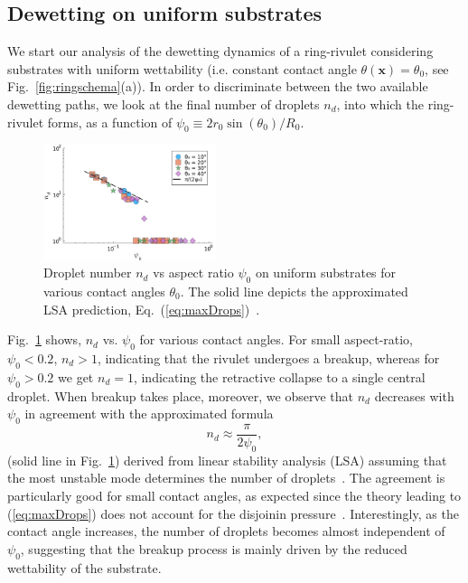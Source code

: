 \documentclass[twoside,twocolumn,9pt]{article}
\begin{document}
\subsection{Dewetting on uniform substrates}\label{subsec:drop-counting}
We start our analysis of the dewetting dynamics of a ring-rivulet considering substrates with uniform wettability (i.e. constant contact angle $\theta(\mathbf{x}) = \theta_0$, see Fig.~\ref{fig:ringschema}(a)). 
In order to discriminate between the two available dewetting paths, we look at the final number of droplets $n_d$, into which the ring-rivulet forms, as a function of $\psi_0 \equiv 2r_0\sin(\theta_0)/R_0$.
\begin{figure}
    \centering
    \includegraphics[width=0.45\textwidth]{Figure_2.pdf}   
    \caption{Droplet number $n_d$ vs aspect ratio $\psi_0$ on uniform substrates for various contact angles $\theta_0$. 
    The solid line depicts the approximated LSA prediction, Eq.~(\ref{eq:maxDrops})~\cite{gonzalezStabilityLiquidRing2013}.}
    \label{fig:max_drops}
\end{figure}
Fig.~\ref{fig:max_drops} shows, $n_d$ vs. $\psi_0$ for various contact angles. 
For small aspect-ratio, $\psi_0 <0.2$, $n_d>1$, indicating that the rivulet undergoes a breakup, whereas for $\psi_0>0.2$ we get $n_d=1$, indicating the retractive collapse to a single central droplet.
When breakup takes place, moreover, we observe that $n_d$ decreases with $\psi_0$ in agreement with the approximated formula 
\begin{equation}\label{eq:maxDrops}
    n_d \approx \frac{\pi}{2\psi_0},
\end{equation}
(solid line in Fig.~\ref{fig:max_drops}) derived from linear stability analysis (LSA) assuming that the most unstable mode determines the number of droplets~\cite{gonzalezStabilityLiquidRing2013}.
The agreement is particularly good for small contact angles, as expected since the theory leading to (\ref{eq:maxDrops}) does not account for the disjoinin pressure~\cite{gonzalezStabilityLiquidRing2013}. 
Interestingly, as the contact angle increases, the number of droplets becomes almost independent of $\psi_0$, suggesting that the breakup process is mainly driven by the reduced wettability of the substrate.
\end{document}
